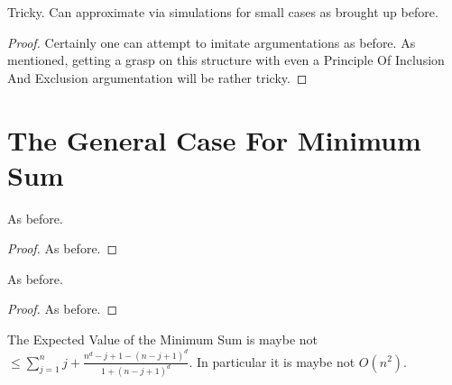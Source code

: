 \documentclass[12pt]{article}
\begin{document}
\begin{theorem}\label{Thm:MiniMax Distribution}
	Tricky. Can approximate via simulations for small cases as brought up before.
\end{theorem}

\begin{proof}
	Certainly one can attempt to imitate argumentations as before. As mentioned, getting a grasp on this structure with even a Principle Of Inclusion And Exclusion argumentation will be rather tricky.
\end{proof}

\section{The General Case For Minimum Sum}

\begin{theorem}\label{Thm:Minimum Sum Algorithm}
	As before.
\end{theorem}

\begin{proof}
	As before.
\end{proof}

\begin{theorem}\label{Thm:Minimum Sum Bounds}
	As before.
\end{theorem}

\begin{proof}
	As before.
\end{proof}

\begin{theorem}\label{Thm:Minimum Sum Expected Value And Sum}
	The Expected Value of the Minimum Sum is maybe not $\le \sum_{j=1}^n j+\frac{n^d-j+1-(n-j+1)^d}{1+(n-j+1)^d}$. In particular it is maybe not $O(n^2)$.
\end{theorem}
\end{document}
